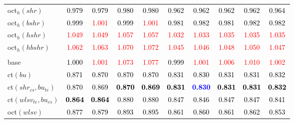 \begin{tabular}[t]{>{\centering\arraybackslash}m{2.5cm}ccccccccc}
oct$_h(shr)$ & \textcolor{black}{0.979} & \textcolor{black}{0.979} & \textcolor{black}{0.980} & \textcolor{black}{0.980} & \textcolor{black}{0.962} & \textcolor{black}{0.962} & \textcolor{black}{0.962} & \textcolor{black}{0.962} & \textcolor{black}{0.964}\\
oct$_h(bshr)$ & \textcolor{black}{0.999} & \textcolor{red}{1.001} & \textcolor{black}{0.999} & \textcolor{red}{1.001} & \textcolor{black}{0.981} & \textcolor{black}{0.982} & \textcolor{black}{0.981} & \textcolor{black}{0.982} & \textcolor{black}{0.982}\\
oct$_h(hshr)$ & \textcolor{red}{1.049} & \textcolor{red}{1.049} & \textcolor{red}{1.057} & \textcolor{red}{1.057} & \textcolor{red}{1.032} & \textcolor{red}{1.033} & \textcolor{red}{1.035} & \textcolor{red}{1.035} & \textcolor{red}{1.035}\\
oct$_h(hbshr)$ & \textcolor{red}{1.062} & \textcolor{red}{1.063} & \textcolor{red}{1.070} & \textcolor{red}{1.072} & \textcolor{red}{1.045} & \textcolor{red}{1.046} & \textcolor{red}{1.048} & \textcolor{red}{1.050} & \textcolor{red}{1.047}\\
\addlinespace[0.3em]
\multicolumn{10}{c}{\textbf{$k = 2$}}\\
base & \textcolor{black}{1.000} & \textcolor{red}{1.001} & \textcolor{red}{1.073} & \textcolor{red}{1.077} & \textcolor{black}{0.999} & \textcolor{red}{1.001} & \textcolor{red}{1.006} & \textcolor{red}{1.010} & \textcolor{red}{1.002}\\
ct$(bu)$ & \textcolor{black}{0.871} & \textcolor{black}{0.870} & \textcolor{black}{0.870} & \textcolor{black}{0.870} & \textcolor{black}{0.831} & \textcolor{black}{0.830} & \textcolor{black}{0.831} & \textcolor{black}{0.831} & \textcolor{black}{0.832}\\
ct$(shr_{cs}, bu_{te})$ & \textcolor{black}{0.870} & \textcolor{black}{0.869} & \textcolor{black}{\textbf{0.870}} & \textcolor{black}{\textbf{0.869}} & \textcolor{black}{\textbf{0.831}} & \textcolor{blue}{\textbf{0.830}} & \textcolor{black}{\textbf{0.831}} & \textcolor{black}{\textbf{0.831}} & \textcolor{black}{\textbf{0.832}}\\
ct$(wlsv_{te}, bu_{cs})$ & \textcolor{black}{\textbf{0.864}} & \textcolor{black}{\textbf{0.864}} & \textcolor{black}{0.880} & \textcolor{black}{0.880} & \textcolor{black}{0.847} & \textcolor{black}{0.846} & \textcolor{black}{0.847} & \textcolor{black}{0.847} & \textcolor{black}{0.841}\\
oct$(wlsv)$ & \textcolor{black}{0.877} & \textcolor{black}{0.879} & \textcolor{black}{0.893} & \textcolor{black}{0.895} & \textcolor{black}{0.861} & \textcolor{black}{0.860} & \textcolor{black}{0.861} & \textcolor{black}{0.862} & \textcolor{black}{0.853}\\

\end{tabular}
